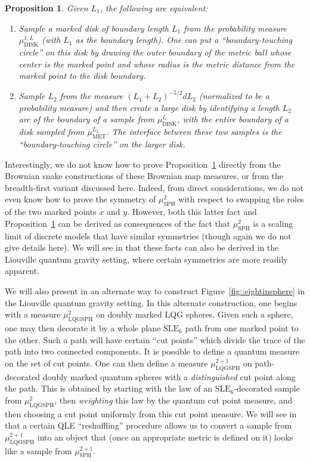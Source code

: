 \documentclass[JEP,XML,SOM,Unicode]{cedram}
\theoremstyle{plain}
\numberwithin{theorem}{section}
\newtheorem{proposition}[theorem]{Proposition}
\theoremstyle{definition}
\newcommand{\SLE}{\mathrm{SLE}}
\newcommand{\mustwo}{\mu_{\mathrm{SPH}}^2}
\newcommand{\mustwoplusone}{\mu_{\mathrm{SPH}}^{2+1}}
\newcommand{\mudonel}{\mu_{ \mathrm{DISK}}^{1, L}}
\newcommand{\mudl}{\mu_{\mathrm{DISK}}^L}
\def\mumlset#1{\mu_{\mathrm{MET}}^{#1}}
\begin{document}
\begin{proposition}
\label{prop::twowaystobuildmarkeddisc}
Given $L_1$, the following are equivalent:
\begin{enumerate}
\item Sample a marked disk of boundary length $L_1$ from the probability measure $\mudonel$ (with $L_1$ as the boundary length). One can put a ``boundary-touching circle'' on this disk by drawing the outer boundary of the metric ball whose center is the marked point and whose radius is the metric distance from the marked point to the disk boundary.
\item Sample $L_2$ from the measure $(L_1 + L_2)^{-5/2}dL_2$ (normalized to be a probability measure) and then create a large disk by identifying a length $L_2$ arc of the boundary of a sample from $\mudl$, with the entire boundary of a disk sampled from $\mumlset{L_2}$. The interface between these two samples is the ``boundary-touching circle'' on the larger disk.
\end{enumerate}
\end{proposition}

Interestingly, we do not know how to prove Proposition~\ref{prop::twowaystobuildmarkeddisc} directly from the Brownian snake constructions of these Brownian map measures, or from the breadth-first variant discussed here. Indeed, from direct considerations, we do not even know how to prove the symmetry of $\mustwo$ with respect to swapping the roles of the two marked points $x$ and $y$. However, both this latter fact and Proposition~\ref{prop::twowaystobuildmarkeddisc} can be derived as consequences of the fact that $\mustwo$ is a scaling limit of discrete models that have similar symmetries (though again we do not give details here). We will see in \cite{qlebm, qle_continuity} that these facts can also be derived in the Liouville quantum gravity setting, where certain symmetries are more readily apparent.

We will also present in \cite{qlebm, qle_continuity} an alternate way to construct Figure~\ref{fig::eightinsphere} in the Liouville quantum gravity setting. In this alternate construction, one begins with a measure $\mu^2_{\mathrm{LQGSPH}}$ on doubly marked LQG spheres. Given such a sphere, one may then decorate it by a whole plane $\SLE_6$ path from one marked point to the other. Such a path will have certain ``cut points'' which divide the trace of the path into two connected components. It is possible to define a quantum measure on the set of cut points. One can then define a measure $\mu^{2+1}_{\mathrm{LQGSPH}}$ on path-decorated doubly marked quantum spheres with a \emph{distinguished} cut point along the path. This is obtained by starting with the law of an $\SLE_6$-decorated sample from $\mu^2_{\mathrm{LQGSPH}}$, then \emph{weighting} this law by the quantum cut point measure, and then choosing a cut point uniformly from this cut point measure. We will see in \cite{qlebm, qle_continuity} that a certain QLE ``reshuffling'' procedure allows us to convert a sample from $\mu^{2+1}_{\mathrm{LQGSPH}}$ into an object that (once an appropriate metric is defined on it) looks like a sample from $\mustwoplusone$.
\end{document}
